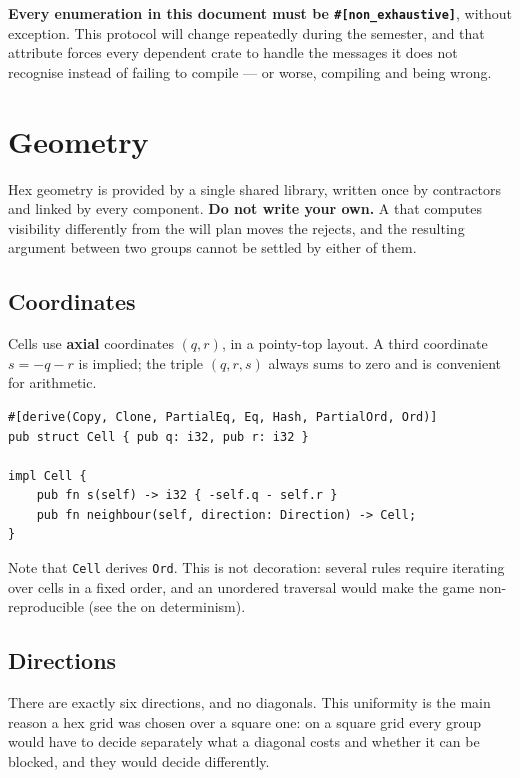 \documentclass{article}
\begin{document}
\textbf{Every enumeration in this document must be \texttt{\#[non\_exhaustive]}}, without
exception. This protocol will change repeatedly during
the semester, and that attribute forces every dependent crate to handle the messages it does not
recognise instead of failing to compile --- or worse, compiling and being wrong.

\newpage
\section{Geometry}
\label{proto:geometry}

Hex geometry is provided by a single shared library, written once by contractors and linked by
every component. \textbf{Do not write your own.} A \ship{} that computes visibility differently
from the \chart{} will plan moves the \chart{} rejects, and the resulting argument between two
groups cannot be settled by either of them.

\subsection{Coordinates}
\label{proto:coords}

Cells use \textbf{axial} coordinates $(q, r)$, in a pointy-top layout. A third coordinate
$s = -q - r$ is implied; the triple $(q, r, s)$ always sums to zero and is convenient for
arithmetic.

\begin{lstlisting}
#[derive(Copy, Clone, PartialEq, Eq, Hash, PartialOrd, Ord)]
pub struct Cell { pub q: i32, pub r: i32 }

impl Cell {
    pub fn s(self) -> i32 { -self.q - self.r }
    pub fn neighbour(self, direction: Direction) -> Cell;
}
\end{lstlisting}

Note that \texttt{Cell} derives \texttt{Ord}. This is not decoration: several rules require
iterating over cells in a fixed order, and an unordered traversal would make the game
non-reproducible (see the \MD{} on determinism).

\subsection{Directions}
\label{proto:directions}

There are exactly six directions, and no diagonals. This uniformity is the main reason a hex grid
was chosen over a square one: on a square grid every group would have to decide separately what a
diagonal costs and whether it can be blocked, and they would decide differently.
\end{document}
